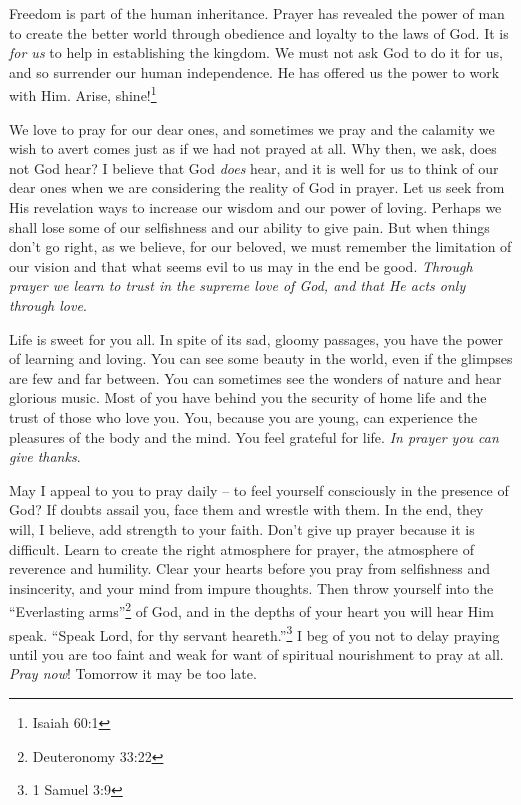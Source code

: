 Freedom is part of the human inheritance. Prayer has
revealed the power of man to create the better world
through obedience and loyalty to the laws of God. It is
\textsl{for us} to help in establishing the kingdom. We must not ask
God to do it for us, and so surrender our human independence.
He has offered us the power to work with Him.
Arise, shine!\footnote{Isaiah 60:1}

We love to pray for our dear ones, and sometimes we
pray and the calamity we wish to avert comes just as if we
had not prayed at all. Why then, we ask, does not God
hear? I believe that God \textsl{does} hear, and it is well for us
to think of our dear ones when we are considering the
reality of God in prayer. Let us seek from His revelation
ways to increase our wisdom and our power of loving.
Perhaps we shall lose some of our selfishness and our
ability to give pain. But when things don't go right, as
we believe, for our beloved, we must remember the limitation
of our vision and that what seems evil to us may in
the end be good. \textsl{Through prayer we learn to trust in the
supreme love of God, and that He acts only through love}.

Life is sweet for you all. In spite of its sad,
gloomy passages, you have the power of learning and loving.
You can see some beauty in the world, even if the glimpses
are few and far between. You can sometimes see the wonders
of nature and hear glorious music. Most of you have behind
you the security of home life and the trust of those who
love you. You, because you are young, can experience the
pleasures of the body and the mind. You feel grateful for
life. \textsl{In prayer you can give thanks}.

May I appeal to you to pray daily -- to feel yourself
consciously in the presence of God? If doubts assail you,
face them and wrestle with them. In the end, they will, I
believe, add strength to your faith. Don't give up prayer
because it is difficult. Learn to create the right atmosphere
for prayer, the atmosphere of reverence and humility.
Clear your hearts before you pray from selfishness and
insincerity, and your mind from impure thoughts. Then
throw yourself into the ``Everlasting arms''\footnote{Deuteronomy 33:22} of God, and in
the depths of your heart you will hear Him speak. ``Speak
Lord, for thy servant heareth.''\footnote{1 Samuel 3:9}
I beg of you not to delay
praying until you are too faint and weak for want of
spiritual nourishment to pray at all. \textsl{Pray now}! Tomorrow
it may be too late.

